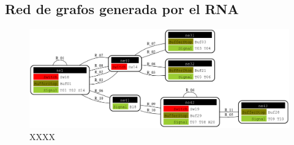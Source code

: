 \subsection{Red de grafos generada por el RNA}

 \lipsum[1]

\begin{figure}[H]
	\centering
	\includegraphics[width=1\textwidth]{Figuras/Graph_7}
	\centering\caption{XXXX}
\end{figure}

\lipsum[1]